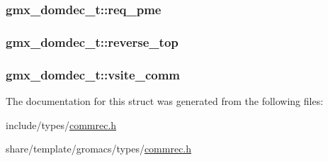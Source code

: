 \hypertarget{structgmx__domdec__t_a5cfe4db2868e90eb47bab14f5b25ed6f}{
\subsubsection[{req\-\_\-pme}]{ {\bf gmx\-\_\-domdec\-\_\-t\-::req\-\_\-pme}}}\label{structgmx__domdec__t_a5cfe4db2868e90eb47bab14f5b25ed6f}
\hypertarget{structgmx__domdec__t_aac4d56164d7c0955ea9341a45d65fa83}{
\subsubsection[{reverse\-\_\-top}]{ {\bf gmx\-\_\-domdec\-\_\-t\-::reverse\-\_\-top}}}\label{structgmx__domdec__t_aac4d56164d7c0955ea9341a45d65fa83}
\hypertarget{structgmx__domdec__t_af7034751c9790e81184338ea0fedf2eb}{
\subsubsection[{vsite\-\_\-comm}]{ {\bf gmx\-\_\-domdec\-\_\-t\-::vsite\-\_\-comm}}}\label{structgmx__domdec__t_af7034751c9790e81184338ea0fedf2eb}


\-The documentation for this struct was generated from the following files\-:\begin{DoxyCompactItemize}
\item 
include/types/\hyperlink{include_2types_2commrec_8h}{commrec.\-h}\item 
share/template/gromacs/types/\hyperlink{share_2template_2gromacs_2types_2commrec_8h}{commrec.\-h}\end{DoxyCompactItemize}
